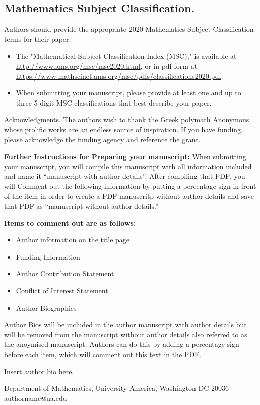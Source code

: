 \documentclass{article}
\theoremstyle{theorem}
\theoremstyle{definition}
\begin{document}
\subsection{Mathematics Subject Classification.}  Authors should provide the appropriate 2020 Mathematics Subject Classification terms for their paper.  
\begin{itemize}
\item The "Mathematical Subject Classification Index (MSC)," is available at \url{http://www.ams.org/msc/msc2020.html}, or in pdf form at \url{https://www.mathscinet.ams.org/msc/pdfs/classifications2020.pdf}. 
\item When submitting your manuscript, please provide at least one and up to three 5-digit MSC classifications that best describe your paper.
\end{itemize}



\begin{acknowledgment}{Acknowledgments.}
The authors wish to thank the Greek polymath Anonymous, whose prolific works are an endless source of inspiration.  If you have funding, please acknowledge the funding agency and reference the grant.
\end{acknowledgment}





\noindent \textbf{Further Instructions for Preparing your manuscript:}
When submitting your manuscript, you will compile this manuscript with all information included and name it ``manuscript with author details''.
After compiling that PDF, you will Comment out the following information by putting a percentage sign in front of the item in order to create a PDF manuscritp without author details and save that PDF as ``manuscript without author details.''

\noindent \textbf{Items to comment out are as follows:}
\begin{itemize}
\item Author information on the title page
\item Funding Information
\item Author Contribution Statement
\item Conflict of Interest Statement
\item Author Biographies 
\end{itemize}

Author Bios will be included in the author manuscript with author details but will be removed from the manuscript without author details also referred to as the anoymised manuscript. Authors can do this by adding a percentage sign before each item, which will comment out this text in the PDF.
\begin{biog}
\item[Author Name 1] Insert author bio here.
\begin{affil}
Department of Mathematics, University America, Washington DC 20036\\
authorname@ua.edu
\end{affil}
\end{biog}
\end{document}
